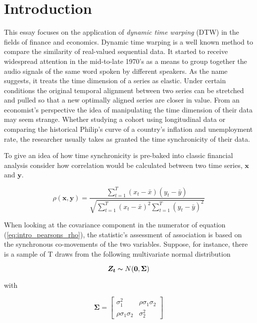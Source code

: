 \documentclass[12pt]{report}
\begin{document}
\chapter{Introduction}

This essay focuses on the application of \textit{dynamic time warping} (DTW) in the fields of finance and economics. Dynamic time warping is a well known method to compare the similarity of real-valued sequential data. It started to receive widespread attention in the mid-to-late 1970's \cite{SakoeChiba_IEEE_1978,Itakura_1975} as a means to group together the audio signals of the same word spoken by different speakers. As the name suggests, it treats the time dimension of a series as elastic. Under certain conditions the original temporal alignment between two series can be stretched and pulled so that a new optimally aligned series are closer in value. From an economist's perspective the idea of manipulating the time dimension of their data may seem strange. Whether studying a cohort using longitudinal data or comparing the historical Philip's curve of a country's inflation and unemployment rate, the researcher usually takes as granted the time synchronicity of their data.

 To give an idea of how time synchronicity is pre-baked into classic financial analysis consider how correlation would be calculated between two time series, $\boldsymbol{x}$ and $\boldsymbol{y}$.

\begin{equation} \label{eq:intro_pearsons_rho}
\rho(\boldsymbol{x}, \boldsymbol{y}) = \frac{ \sum_{t=1}^{T} (x_{t} - \bar{x}) (y_{t} - \bar{y})}{ \sqrt{\sum_{t=1}^{T} (x_{t} - \bar{x})^{2} \sum_{t=1}^{T} (y_{t} - \bar{y})^{2}}}
\end{equation}

When looking at the covariance component in the numerator of equation (\ref{eq:intro_pearsons_rho}), the statistic's assessment of association is based on the synchronous co-movements of the two variables. Suppose, for instance, there is a sample of T draws from the following multivariate normal distribution

\begin{equation}
    \boldsymbol{Z_{t}} \thicksim N(\boldsymbol{0}, \boldsymbol{\Sigma})
\end{equation}

with 

\begin{equation}
    \boldsymbol{\Sigma} = \begin{bmatrix}
        \sigma_{1}^{2}             & \rho \sigma_{1}\sigma_{2} \\
        \rho \sigma_{1} \sigma_{2} & \sigma_{2}^{2} 
    \end{bmatrix}
\end{equation}
\end{document}
